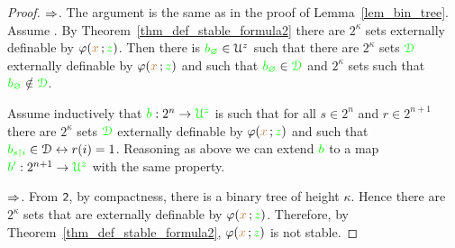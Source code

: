 \begin{proof}
  $\Rightarrow$.
  The argument is the same as in the proof of Lemma~\ref{lem_bin_tree}.
  Assume . 
  By Theorem~\ref{thm_def_stable_formula2} there are $2^\kappa$ sets externally definable by $\varphi({\color{brown} x}\,;{\color{green} z})$.
  Then there is ${\color{green} b_\varnothing}\in{\EuScript U^z}$ such that there are $2^\kappa$ sets ${\color{green}\EuScript D}$ externally definable by $\varphi({\color{brown} x}\,;{\color{green} z})$ and such that ${\color{green} b_\varnothing}\in{\color{green}\EuScript D}$ and $2^\kappa$ sets such that ${\color{green} b_\varnothing}\notin{\color{green}\EuScript D}$.

  Assume inductively that ${\color{green} b}:2^n\to{\color{green}\EuScript U^z}$ is such that for all $s\in2^n$ and $r\in2^{n+1}$ there are $2^\kappa$ sets ${\color{green}\EuScript D}$ externally definable by $\varphi({\color{brown} x}\,;{\color{green} z})$ and such that ${\color{green} b_{s\restriction i}}\in\EuScript D\leftrightarrow r(i)=1$.
  Reasoning as above we can extend ${\color{green} b}$ to a map ${\color{green} b'}:2^{n+1}\to{\color{green}\EuScript U^z}$ with the same property.

  


  






  $\Rightarrow$. From $\textsf{\small 2}$, by compactness, there is a binary tree of height $\kappa$. 
  Hence there are $2^\kappa$ sets that are externally definable by $\varphi({\color{brown} x}\,;{\color{green} z})$.
  Therefore, by Theorem~\ref{thm_def_stable_formula2}, $\varphi({\color{brown} x}\,;{\color{green} z})$ is not stable.
\end{proof}

